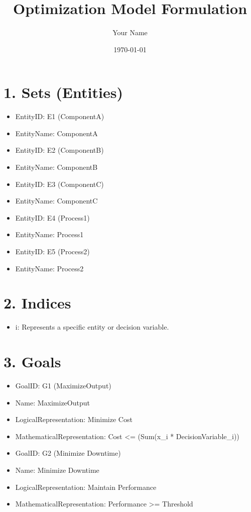 \documentclass{article}
\title{Optimization Model Formulation}
\author{Your Name}
\date{\today}
\begin{document}
\maketitle
\tableofcontents

\section{1. Sets (Entities)}
\begin{itemize}
    \item EntityID: E1 (ComponentA)
    \item EntityName: ComponentA
    \item EntityID: E2 (ComponentB)
    \item EntityName: ComponentB
    \item EntityID: E3 (ComponentC)
    \item EntityName: ComponentC
    \item EntityID: E4 (Process1)
    \item EntityName: Process1
    \item EntityID: E5 (Process2)
    \item EntityName: Process2
\end{itemize}

\section{2. Indices}
\begin{itemize}
  \item i: Represents a specific entity or decision variable.
\end{itemize}

\section{3. Goals}
\begin{itemize}
    \item GoalID: G1 (MaximizeOutput)
        \item Name: MaximizeOutput
        \item LogicalRepresentation: Minimize Cost
        \item MathematicalRepresentation: Cost <= (Sum(x_i * DecisionVariable_i))
    \item GoalID: G2 (Minimize Downtime)
        \item Name: Minimize Downtime
        \item LogicalRepresentation: Maintain Performance
        \item MathematicalRepresentation: Performance >= Threshold
\end{itemize}
\end{document}
